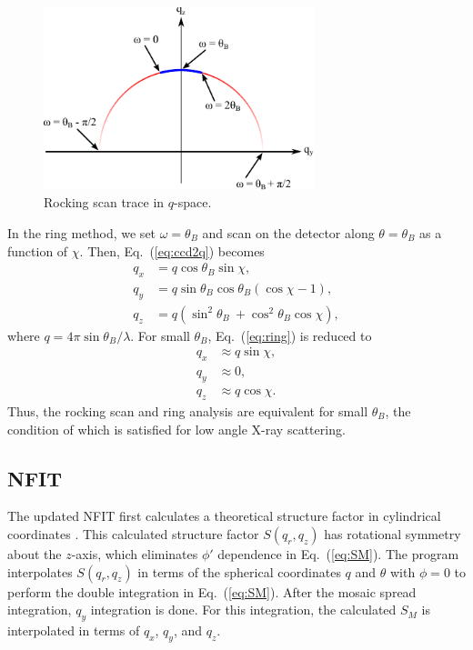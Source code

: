 \begin{figure}
  \centering
  \includegraphics[width=0.7\textwidth]{figures/ripple/mosaic/rock}
  \caption{Rocking scan trace in $q$-space.}
  \label{fig:rock}
\end{figure}

In the ring method, we set $\omega=\theta_B$ and scan on the detector
along $\theta=\theta_B$ as a function of $\chi$. 
Then, Eq.~(\ref{eq:ccd2q}) becomes
\begin{align}
  q_x &= q\cos\theta_B\sin\chi, \nonumber\\
  q_y &= q\sin\theta_B\cos\theta_B(\cos\chi-1), \nonumber\\
  q_z &= q(\sin^2\theta_B\ + \cos^2\theta_B\cos\chi),
  \label{eq:ring}
\end{align}
where $q=4\pi\sin\theta_B/\lambda$. For small $\theta_B$, Eq.~(\ref{eq:ring})
is reduced to
\begin{align}
  q_x &\approx q\sin\chi, \nonumber\\
  q_y &\approx 0, \nonumber\\
  q_z &\approx q\cos\chi.
  \label{eq:ring_small}
\end{align}
Thus, the rocking scan and ring analysis are equivalent for small $\theta_B$,
the condition of which is satisfied for low angle X-ray scattering.

\subsection{NFIT}
The updated NFIT first calculates a theoretical structure factor in 
cylindrical coordinates \cite{Lyatskaya01}. This calculated structure factor $S(q_r,q_z)$
has rotational symmetry about the $z$-axis, which eliminates $\phi'$ dependence
in Eq.~(\ref{eq:SM}). The program interpolates $S(q_r,q_z)$ in terms
of the spherical coordinates $q$ and $\theta$ with $\phi=0$ 
to perform the double integration in Eq.~(\ref{eq:SM}). 
After the mosaic spread integration, $q_y$ integration is done.
For this integration, the calculated $S_M$ is interpolated 
in terms of $q_x$, $q_y$, and $q_z$.

